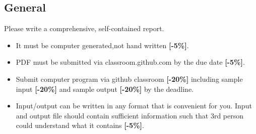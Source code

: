 \documentclass{article}
\begin{document}
\subsection{General}
Please write a comprehensive, self-contained report.
                \begin{itemize}
                        \item It must be computer generated,not hand written 
                                {\color{red}\textbf{[-5\%]}}.
                        \item PDF must be submitted via classroom.github.com by 
                                the due date  {\color{red}\textbf{[-5\%]}}.
                        \item Submit computer program via github classroom 
                                 {\color{red}\textbf{[-20\%]}} including sample input  {\color{red}\textbf{[-20\%]}} 
                                and sample output  {\color{red}\textbf{[-20\%]}} by the deadline.
                        \item    Input/output can be written in any format that is convenient 
                                for you.  Input and output file should contain sufficient 
                                information such that 3rd person could understand what it 
                                contains  {\color{red}\textbf{[-5\%]}}.
                \end{itemize}
\end{document}
